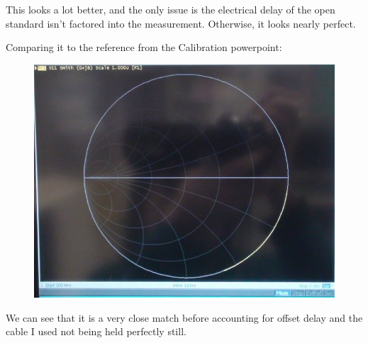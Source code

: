 \documentclass[11pt]{article}
\begin{document}
This looks a lot better, and the only issue is the electrical delay of the open standard isn't factored into the measurement. Otherwise, it looks nearly perfect.

Comparing it to the reference from the Calibration powerpoint:

\begin{figure}[H]
	\centering \includegraphics[width=\linewidth-6cm]{images/S11_OPEN_STD_REFERENCE.JPG}
\end{figure}

We can see that it is a very close match before accounting for offset delay and the cable I used not being held perfectly still.
\end{document}
